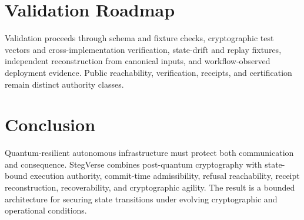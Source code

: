 \documentclass[11pt]{article}
\begin{document}
\section{Validation Roadmap}
Validation proceeds through schema and fixture checks, cryptographic test vectors and cross-implementation verification, state-drift and replay fixtures, independent reconstruction from canonical inputs, and workflow-observed deployment evidence. Public reachability, verification, receipts, and certification remain distinct authority classes.

\section{Conclusion}
Quantum-resilient autonomous infrastructure must protect both communication and consequence. StegVerse combines post-quantum cryptography with state-bound execution authority, commit-time admissibility, refusal reachability, receipt reconstruction, recoverability, and cryptographic agility. The result is a bounded architecture for securing state transitions under evolving cryptographic and operational conditions.



\end{document}
